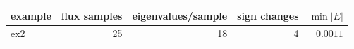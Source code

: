 \begin{tabular}{@{}lrrrr@{}}
\toprule
example & flux samples & eigenvalues/sample & sign changes & $\min |E|$ \\
\midrule
ex2 & 25 & 18 & 4 & $0.0011$ \\
\bottomrule
\end{tabular}

